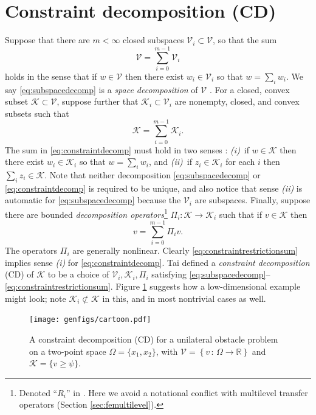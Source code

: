 \documentclass[letterpaper,final,12pt,reqno]{amsart}
\theoremstyle{cstyle}
\theoremstyle{cstyle*}
\theoremstyle{dstyle}
\numberwithin{equation}{section}
\numberwithin{figure}{section}
\numberwithin{table}{section}
\numberwithin{theorem}{section}
\newcommand{\RR}{\mathbb{R}}
\newcommand{\cK}{\mathcal{K}}
\newcommand{\cV}{\mathcal{V}}
\begin{document}
\section{Constraint decomposition (CD)} \label{sec:cd}

Suppose that there are $m<\infty$ closed subspaces $\cV_i \subset \cV$, so that the sum
\begin{equation}
\cV = \sum_{i=0}^{m-1} \cV_i \label{eq:subspacedecomp}
\end{equation}
holds in the sense that if $w \in \cV$ then there exist $w_i \in \cV_i$ so that $w = \sum_i w_i$.  We say \eqref{eq:subspacedecomp} is a \emph{space decomposition} of $\cV$ \cite{Xu1992}.  For a closed, convex subset $\cK \subset \cV$, suppose further that $\cK_i \subset \cV_i$ are nonempty, closed, and convex subsets such that
\begin{equation}
\cK = \sum_{i=0}^{m-1} \cK_i. \label{eq:constraintdecomp}
\end{equation}
The sum in \eqref{eq:constraintdecomp} must hold in two senses \cite{TaiTseng2002}: \emph{(i)}~if $w \in \cK$ then there exist $w_i \in \cK_i$ so that $w = \sum_i w_i$, and \emph{(ii)}~if $z_i \in \cK_i$ for each $i$ then $\sum_i z_i \in \cK$.  Note that neither decomposition \eqref{eq:subspacedecomp} or \eqref{eq:constraintdecomp} is required to be unique, and also notice that sense \emph{(ii)} is automatic for \eqref{eq:subspacedecomp} because the $\cV_i$ are subspaces.  Finally, suppose there are bounded \emph{decomposition operators}\footnote{Denoted ``$R_i$'' in \cite{Tai2003}.  Here we avoid a notational conflict with multilevel transfer operators (Section \ref{sec:femultilevel}).} $\Pi_i : \cK \to \cK_i$ such that if $v \in \cK$ then
\begin{equation}
v = \sum_{i=0}^{m-1} \Pi_i v.  \label{eq:constraintrestrictionsum}
\end{equation}
The operators $\Pi_i$ are generally nonlinear.  Clearly \eqref{eq:constraintrestrictionsum} implies sense \emph{(i)} for \eqref{eq:constraintdecomp}. Tai \cite{Tai2003} defined a \emph{constraint decomposition} (CD) of $\cK$ to be a choice of $\cV_i,\cK_i,\Pi_i$ satisfying \eqref{eq:subspacedecomp}--\eqref{eq:constraintrestrictionsum}.  Figure \ref{fig:cartoon} suggests how a low-dimensional example might look; note $\cK_i \not\subset \cK$ in this, and in most nontrivial cases as well.

\begin{figure}[ht]
\texttt{[image: genfigs/cartoon.pdf]}
\caption{A constraint decomposition (CD) for a unilateral obstacle problem on a two-point space $\Omega=\{x_1,x_2\}$, with $\mathcal{V}=\left\{v \,:\, \Omega \to \RR\right\}$ and $\mathcal{K}=\{v\ge \psi\}$.}
\label{fig:cartoon}
\end{figure}
\end{document}
